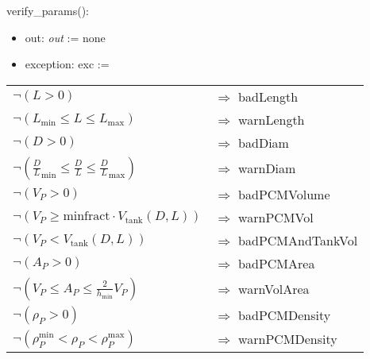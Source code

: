 \documentclass[12pt, titlepage]{article}
\begin{document}
\noindent verify\_params():
\begin{itemize}
\item out: \textit{out} := none
\item exception: exc := 
\end{itemize}
\noindent \begin{longtable*}[l]{l l} 
$\neg (L > 0)$ & $\Rightarrow$ badLength\\
$\neg (L_{\text{min}} \leq L \leq L_{\text{max}})$ & $\Rightarrow$ warnLength\\
$\neg (D > 0)$ & $\Rightarrow$ badDiam\\
$\neg ({\frac{D}{L}}_\text{min} \leq \frac{D}{L} \leq {\frac{D}{L}}_\text{max})$ & $\Rightarrow$ warnDiam\\
$\neg (V_P > 0)$ & $\Rightarrow$ badPCMVolume\\
$ \neg (V_P \geq \text{minfract} \cdot V_{\text{tank}}(D, L)) $ & $\Rightarrow$ warnPCMVol\\
$\neg (V_P < V_{\text{tank}}(D, L))$ & $\Rightarrow$ badPCMAndTankVol\\
$\neg (A_P > 0)$ & $\Rightarrow$ badPCMArea\\
$\neg (V_P \leq A_P \leq \frac{2}{h_\text{min}} V_P)$ & $\Rightarrow$ warnVolArea\\
$\neg (\rho_P > 0)$  & $\Rightarrow$ badPCMDensity\\
$\neg (\rho_P^{\text{min}} < \rho_P < \rho_P^{\text{max}})$ & $\Rightarrow$ warnPCMDensity\\

\end{longtable*}
\end{document}
